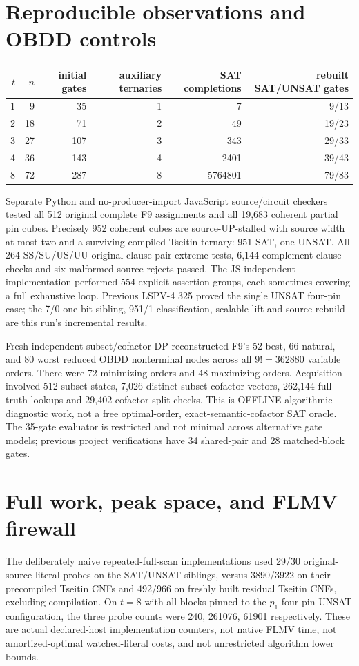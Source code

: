 \documentclass[11pt]{article}
\begin{document}
\section{Reproducible observations and OBDD controls}
\begin{center}\small
\begin{tabular}{rrrrrr}
\toprule
$t$&$n$&initial gates&auxiliary ternaries&SAT completions&rebuilt SAT/UNSAT gates\\
\midrule
1&9&35&1&7&9/13\\
2&18&71&2&49&19/23\\
3&27&107&3&343&29/33\\
4&36&143&4&2401&39/43\\
8&72&287&8&5764801&79/83\\
\bottomrule
\end{tabular}
\end{center}
Separate Python and no-producer-import JavaScript source/circuit checkers
tested all 512 original complete F9 assignments and all 19,683
coherent partial pin cubes. Precisely 952 coherent cubes
are source-UP-stalled with source width at most two and a
surviving compiled Tseitin ternary: 951 SAT, one UNSAT.
All 264 SS/SU/US/UU original-clause-pair extreme tests,
6,144 complement-clause checks and six malformed-source
rejects passed. The JS independent implementation performed
554 explicit assertion groups, each sometimes covering a full
exhaustive loop. Previous LSPV-4 325 proved the single
UNSAT four-pin case; the 7/0 one-bit sibling, 951/1
classification, scalable lift and source-rebuild are this run's
incremental results.

Fresh independent subset/cofactor DP reconstructed F9's
52 best, 66 natural, and 80 worst reduced OBDD
nonterminal nodes across all $9!=362880$ variable orders.
There were 72 minimizing orders and 48 maximizing orders.
Acquisition involved 512 subset states, 7,026 distinct
subset-cofactor vectors, 262,144 full-truth lookups
and 29,402 cofactor split checks.
This is OFFLINE algorithmic diagnostic work, not a
free optimal-order, exact-semantic-cofactor SAT oracle.
The 35-gate evaluator is restricted and not minimal across
alternative gate models; previous project verifications
have 34 shared-pair and 28 matched-block gates.

\section{Full work, peak space, and FLMV firewall}
The deliberately naive repeated-full-scan implementations
used 29/30 original-source literal probes on the SAT/UNSAT
siblings, versus 3890/3922 on their precompiled Tseitin
CNFs and 492/966 on freshly built residual Tseitin CNFs,
excluding compilation. On $t=8$ with all blocks pinned
to the $p_1$ four-pin UNSAT configuration, the three
probe counts were 240, 261076, 61901 respectively.
These are actual declared-host implementation counters,
not native FLMV time, not amortized-optimal watched-literal
costs, and not unrestricted algorithm lower bounds.
\end{document}
